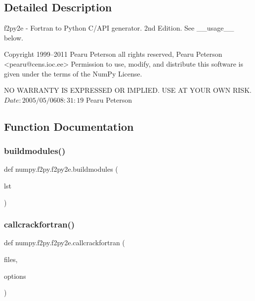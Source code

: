 \subsection{Detailed Description}
\begin{DoxyVerb}f2py2e - Fortran to Python C/API generator. 2nd Edition.
     See __usage__ below.

Copyright 1999--2011 Pearu Peterson all rights reserved,
Pearu Peterson <pearu@cens.ioc.ee>
Permission to use, modify, and distribute this software is given under the
terms of the NumPy License.

NO WARRANTY IS EXPRESSED OR IMPLIED.  USE AT YOUR OWN RISK.
$Date: 2005/05/06 08:31:19 $
Pearu Peterson\end{DoxyVerb}
 

\subsection{Function Documentation}
\mbox{\label{namespacenumpy_1_1f2py_1_1f2py2e_a87c69837a50df4103e22e4014fd653f5}} 
\subsubsection{\texorpdfstring{buildmodules()}{buildmodules()}}
{\footnotesize\ttfamily def numpy.\+f2py.\+f2py2e.\+buildmodules (\begin{DoxyParamCaption}\item[{}]{lst }\end{DoxyParamCaption})}

\mbox{\label{namespacenumpy_1_1f2py_1_1f2py2e_af9fb4dd099c7fea33d1fa5acd72d8830}} 
\subsubsection{\texorpdfstring{callcrackfortran()}{callcrackfortran()}}
{\footnotesize\ttfamily def numpy.\+f2py.\+f2py2e.\+callcrackfortran (\begin{DoxyParamCaption}\item[{}]{files,  }\item[{}]{options }\end{DoxyParamCaption})}

